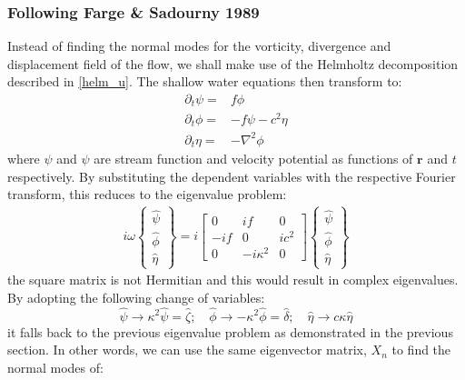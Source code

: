 \subsubsection{Following Farge \& Sadourny 1989}
Instead of finding the normal modes for the vorticity, divergence and
displacement field of the flow, we shall make use of the Helmholtz
decomposition described in \eqref{helm_u}. The shallow water equations then
transform to:
\begin{align}
    \partial_t \psi = & f \phi
    \label{dtpsi_l}                                        \\
    \partial_t \phi = & -f \psi - c^2 \eta \label{dtphi_l} \\
    \partial_t \eta = & - \nabla^2 \phi \label{dteta_l2}
\end{align}
where $\psi$ and $\psi$ are stream function and velocity potential as functions
of $\mathbf{r}$ and $t$ respectively. By substituting the dependent
variables with the respective Fourier transform, this reduces to the eigenvalue
problem:
\begin{align}
    i\omega
    \begin{Bmatrix}
        \hat{\psi} \\ \hat{\phi} \\ \hat{\eta}
    \end{Bmatrix}
    = i
    \begin{bmatrix}
        0   & if         & 0    \\
        -if & 0          & ic^2 \\
        0   & -i\kappa^2 & 0
    \end{bmatrix}
    \begin{Bmatrix}
        \hat{\psi} \\ \hat{\phi} \\ \hat{\eta}
    \end{Bmatrix}
\end{align}
the square matrix is not Hermitian and this would result in complex
eigenvalues. By adopting the following change of variables:
\begin{equation}
    \hat{\psi} \to \kappa^2\hat \psi = \hat{\zeta} ; \quad
    \hat{\phi} \to -\kappa^2\hat \phi = \hat{\delta}; \quad
    \hat{\eta} \to c\kappa\hat \eta
\end{equation}
it falls back to the previous eigenvalue problem as demonstrated in the
previous section. In other words, we can use the same eigenvector matrix, $X_n$
to find the normal modes of:


